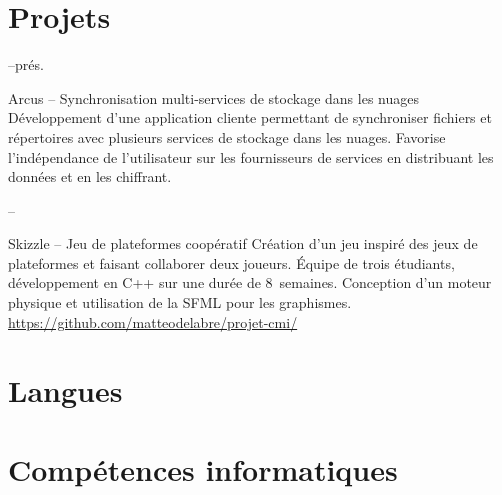 \documentclass[sans]{moderncv}
\newcommand{\fillmid}{\hfill--\hfill}
\newcommand{\stackdate}[2]%
    {\parbox[t]{9mm}{\centering{#1\par\vspace{-1mm} \small{#2}}}}
\begin{document}
\section{Projets}

\cventry%
{\stackdate{2017}{janvier}\fillmid{}prés.}%
{Arcus -- Synchronisation multi-services de stockage dans les nuages}%
{}{}{}%
{Développement d’une application cliente permettant de synchroniser fichiers et répertoires avec plusieurs services de stockage dans les nuages. Favorise l’indépendance de l’utilisateur sur les fournisseurs de services en distribuant les données et en les chiffrant.}

\cventry%
{\stackdate{2016}{mars}\fillmid\stackdate{2016}{mai}}%
{Skizzle -- Jeu de plateformes coopératif}%
{}{}{}%
{Création d’un jeu inspiré des jeux de plateformes et faisant collaborer deux joueurs. Équipe de trois étudiants, développement en C++ sur une durée de 8~semaines. Conception d’un moteur physique et utilisation de la SFML pour les graphismes.\\\url{https://github.com/matteodelabre/projet-cmi/}}

\section{Langues}


\section{Compétences informatiques}

\end{document}
